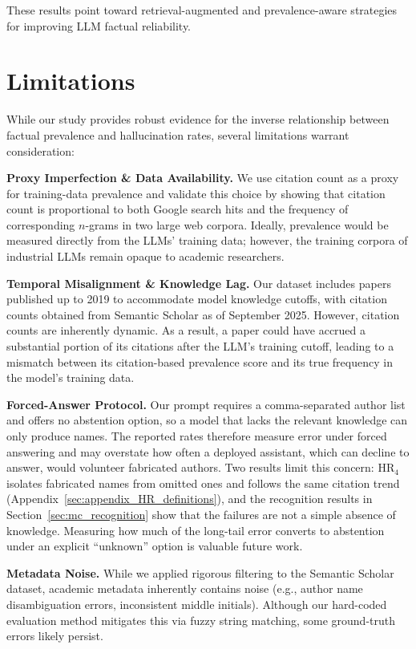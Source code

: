 \documentclass[11pt]{article}
\begin{document}
These results point toward retrieval-augmented and prevalence-aware strategies for improving LLM factual reliability.

\section*{Limitations}
\label{sec:limitations}

While our study provides robust evidence for the inverse relationship between factual prevalence and hallucination rates, several limitations warrant consideration:

\textbf{Proxy Imperfection \& Data Availability.} We use citation count as a proxy for training-data prevalence and validate this choice by showing that citation count is proportional to both Google search hits and the frequency of corresponding $n$-grams in two large web corpora. Ideally, prevalence would be measured directly from the LLMs' training data; however, the training corpora of industrial LLMs remain opaque to academic researchers.

\textbf{Temporal Misalignment \& Knowledge Lag.}
Our dataset includes papers published up to 2019 to accommodate model knowledge cutoffs, with citation counts obtained from Semantic Scholar as of September 2025. However, citation counts are inherently dynamic. As a result, a paper could have accrued a substantial portion of its citations after the LLM's training cutoff, leading to a mismatch between its citation-based prevalence score and its true frequency in the model's training data.

\textbf{Forced-Answer Protocol.} Our prompt requires a comma-separated author list and offers no abstention option, so a model that lacks the relevant knowledge can only produce names. The reported rates therefore measure error under forced answering and may overstate how often a deployed assistant, which can decline to answer, would volunteer fabricated authors. Two results limit this concern: HR$_4$ isolates fabricated names from omitted ones and follows the same citation trend (Appendix~\ref{sec:appendix_HR_definitions}), and the recognition results in Section~\ref{sec:mc_recognition} show that the failures are not a simple absence of knowledge. Measuring how much of the long-tail error converts to abstention under an explicit ``unknown'' option is valuable future work.

\textbf{Metadata Noise.} While we applied rigorous filtering to the Semantic Scholar dataset, academic metadata inherently contains noise (e.g., author name disambiguation errors, inconsistent middle initials). Although our hard-coded evaluation method mitigates this via fuzzy string matching, some ground-truth errors likely persist.
\end{document}
